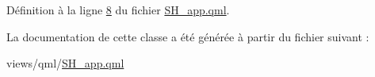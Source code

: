 Définition à la ligne \hyperlink{SH__app_8qml_source_l00008}{8} du fichier \hyperlink{SH__app_8qml_source}{S\-H\-\_\-app.\-qml}.



La documentation de cette classe a été générée à partir du fichier suivant \-:\begin{DoxyCompactItemize}
\item 
views/qml/\hyperlink{SH__app_8qml}{S\-H\-\_\-app.\-qml}\end{DoxyCompactItemize}
